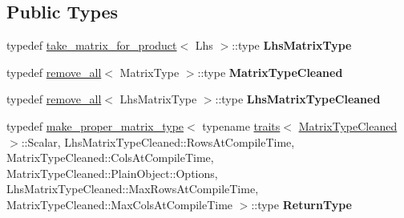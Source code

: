 \subsection*{Public Types}
\begin{DoxyCompactItemize}
\item 
\mbox{\label{struct_eigen_1_1internal_1_1traits_3_01homogeneous__left__product__impl_3_01_homogeneous_3_01_ma5f6080eece96c58f7d2ccea57ec7242b_a595c32d9896fc2f15a47df3abd723427}} 
typedef \hyperlink{struct_eigen_1_1internal_1_1take__matrix__for__product}{take\+\_\+matrix\+\_\+for\+\_\+product}$<$ Lhs $>$\+::type {\bfseries Lhs\+Matrix\+Type}
\item 
\mbox{\label{struct_eigen_1_1internal_1_1traits_3_01homogeneous__left__product__impl_3_01_homogeneous_3_01_ma5f6080eece96c58f7d2ccea57ec7242b_a44842fe354bb9881d2a2eaa09d33b6df}} 
typedef \hyperlink{struct_eigen_1_1internal_1_1remove__all}{remove\+\_\+all}$<$ Matrix\+Type $>$\+::type {\bfseries Matrix\+Type\+Cleaned}
\item 
\mbox{\label{struct_eigen_1_1internal_1_1traits_3_01homogeneous__left__product__impl_3_01_homogeneous_3_01_ma5f6080eece96c58f7d2ccea57ec7242b_a43d1b178bc4d950cb11352deab9fda12}} 
typedef \hyperlink{struct_eigen_1_1internal_1_1remove__all}{remove\+\_\+all}$<$ Lhs\+Matrix\+Type $>$\+::type {\bfseries Lhs\+Matrix\+Type\+Cleaned}
\item 
\mbox{\label{struct_eigen_1_1internal_1_1traits_3_01homogeneous__left__product__impl_3_01_homogeneous_3_01_ma5f6080eece96c58f7d2ccea57ec7242b_ac715b005ae93d6769c5c2d41ffa3f18b}} 
typedef \hyperlink{class_eigen_1_1internal_1_1make__proper__matrix__type}{make\+\_\+proper\+\_\+matrix\+\_\+type}$<$ typename \hyperlink{struct_eigen_1_1internal_1_1traits}{traits}$<$ \hyperlink{group___sparse_core___module}{Matrix\+Type\+Cleaned} $>$\+::Scalar, Lhs\+Matrix\+Type\+Cleaned\+::\+Rows\+At\+Compile\+Time, Matrix\+Type\+Cleaned\+::\+Cols\+At\+Compile\+Time, Matrix\+Type\+Cleaned\+::\+Plain\+Object\+::\+Options, Lhs\+Matrix\+Type\+Cleaned\+::\+Max\+Rows\+At\+Compile\+Time, Matrix\+Type\+Cleaned\+::\+Max\+Cols\+At\+Compile\+Time $>$\+::type {\bfseries Return\+Type}

\end{DoxyCompactItemize}

